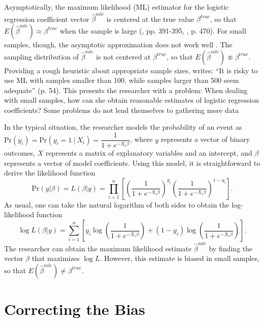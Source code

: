 \documentclass[12pt]{article}
\begin{document}
Asymptotically, the maximum likelihood (ML) estimator for the logistic regression coefficient vector $\hat{\beta}^{mle}$ is centered at the true value $\beta^{true}$, so that $E(\hat{\beta}^{mle}) \approx \beta^{true}$ when the sample is large (\citealt{Wooldridge2002}, pp. 391-395, \citealt{CasellaBerger2002}, p. 470).
For small samples, though, the asymptotic approximation does not work well \citep[pp. 53-54]{Long1997}. 
The sampling distribution of $\hat{\beta}^{mle}$ is not centered at $\beta^{true}$, so that $E(\hat{\beta}^{mle}) \not\approx \beta^{true}$. 
Providing a rough heuristic about appropriate sample sizes, \cite{Long1997} writes: ``It is risky to use ML with samples smaller than 100, while samples larger than 500 seem adequate'' (p. 54).
This presents the researcher with a problem: When dealing with small samples, how can she obtain reasonable estimates of logistic regression coefficients?
Some problems do not lend themselves to gathering more data

In the typical situation, the researcher models the probability of an event as $\text{Pr}(y_i) = \text{Pr}(y_i = 1~|~ X_i) = \dfrac{1}{1 + e^{-X_i\beta}}$, where $y$ represents a vector of binary outcomes, $X$ represents a matrix of explanatory variables and an intercept, and $\beta$ represents a vector of model coefficients. 
Using this model, it is straightforward to derive the likelihood function 
\begin{equation}\nonumber
\text{Pr}(y | \beta) = L(\beta | y) = \displaystyle \prod_{i = 1}^n \left[\left( \dfrac{1}{1 + e^{-X_i\beta}}\right)^{y_i}\left( \dfrac{1}{1 + e^{-X_i\beta}}\right)^{1 - y_i}\right]\text{.}
\end{equation}
\noindent As usual, one can take the natural logarithm of both sides to obtain the log-likelihood function 
\begin{equation}\nonumber
\log L(\beta | y) = \displaystyle \sum_{i = 1}^n \left[y_i \log \left( \dfrac{1}{1 + e^{-X_i\beta}}\right) + (1 - y_i) \log \left( \dfrac{1}{1 + e^{-X_i\beta}}\right)\right].
\end{equation}
\noindent The researcher can obtain the maximum likelihood estimate $\hat{\beta}^{mle}$ by finding the vector $\beta$ that maximizes $\log L$. 
However, this estimate is biased in small samples, so that $E(\hat{\beta}^{mle}) \neq \beta^{true}$.

\section*{Correcting the Bias}
\end{document}
